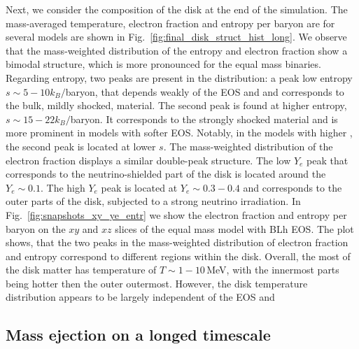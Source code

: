 Next, we consider the composition of the disk at the end of the simulation.
%
The mass-averaged temperature, electron fraction and entropy per baryon
are for several models are shown in Fig.~\ref{fig:final_disk_struct_hist_long}.
%
We observe that the mass-weighted distribution of the entropy and electron 
fraction show a bimodal structure, which is more pronounced for the 
equal mass binaries. 
Regarding entropy, two peaks are present in the distribution:
a peak low entropy $s\sim5-10k_B/$baryon, that depends weakly of the 
\ac{EOS} and \mr{} and corresponds to the bulk, mildly shocked, material. 
The second peak is found at higher entropy, $s\sim15-22k_B/$baryon.
It corresponds to the strongly shocked material and is more prominent 
in models with softer \ac{EOS}. Notably, in the models with higher \mr{}, 
the second peak is located at lower $s$. The mass-weighted distribution 
of the electron fraction displays a similar double-peak structure.
The low $Y_e$ peak that corresponds to the neutrino-shielded part of the 
disk is located around the $Y_e\sim0.1$. The high $Y_e$ peak is located at 
$Y_e\sim0.3-0.4$ and corresponds to the outer parts of the disk, subjected 
to a strong neutrino irradiation.
%
In Fig.~\ref{fig:snapshots_xy_ye_entr} we show the electron fraction 
and entropy per baryon on the $xy$ and $xz$ slices of the equal 
mass model with BLh \ac{EOS}. The plot shows, that the two peaks in the 
mass-weighted distribution of electron fraction and entropy correspond to 
different regions within the disk.
%
Overall, the most of the disk matter has temperature of $T\sim 1-10\,$MeV, with the 
innermost parts being hotter then the outer outermost. 
However, the disk temperature distribution appears to be largely 
independent of the \ac{EOS} and \mr{}



\subsection{Mass ejection on a longed timescale}

